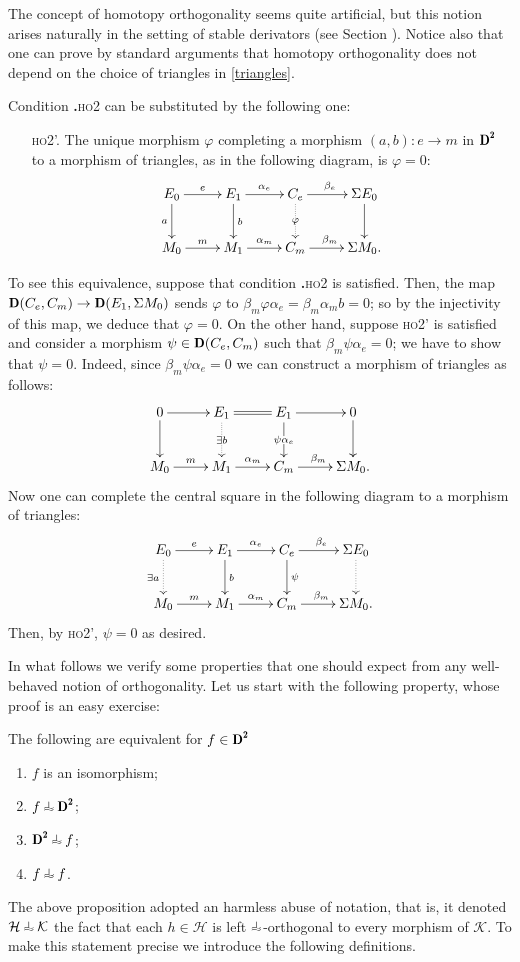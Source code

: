 The concept of homotopy orthogonality seems quite artificial, but this notion arises naturally in the setting of stable derivators (see Section ). Notice also that one can prove by standard arguments that homotopy orthogonality does not depend on the choice of triangles in \eqref{triangles}.
\begin{remark}
Condition \textbf{.}\textsc{ho2} can be substituted by the following one:
\begin{enumerate}%
\item[\textsc{ho}2'.] The unique morphism $\varphi$ completing a morphism $(a,b)\colon e\to m$ in $\cD^\due$ to a morphism of triangles, as in the following diagram, is $\varphi=0$:
$$\xymatrix{
E_0\ar[r]^{e}\ar[d]_a&E_1\ar[r]^{\alpha_e}\ar[d]^b&C_e\ar[r]^{\beta_e}\ar@{.>}[d]|\varphi&\Sigma E_0\ar[d]\\
M_0\ar[r]^m&M_1\ar[r]^{\alpha_m}&C_m\ar[r]^{\beta_m}&\Sigma M_0.
}$$ 
\end{enumerate}
To see this equivalence, suppose that condition \textbf{.}\textsc{ho2} is satisfied. Then, the map $\cD(C_e,C_m)\to \cD(E_1,\Sigma M_0)$ sends $\varphi$ to $\beta_m\varphi\alpha_e=\beta_m\alpha_m b=0$; so by the injectivity of this map, we deduce that $\varphi=0$. On the other hand, suppose \textsc{ho}2' is satisfied and consider a morphism $\psi\in \cD(C_e,C_m)$ such that $\beta_m\psi\alpha_e=0$; we have to show that $\psi=0$. Indeed, since $\beta_m\psi\alpha_e=0$ we can construct a morphism of triangles as follows:
$$\xymatrix{
0\ar[r]\ar[d]&E_1\ar@{=}[r]\ar@{.>}[d]|{\exists b}&E_1\ar[r]^{}\ar[d]|{\psi\alpha_e}&0\ar[d]\\
M_0\ar[r]^m&M_1\ar[r]^{\alpha_m}&C_m\ar[r]^{\beta_m}&\Sigma M_0.
}$$ 
Now one can complete the central square in the following diagram to a morphism of triangles:
$$\xymatrix{
E_0\ar[r]^{e}\ar@{.>}[d]_{\exists a}&E_1\ar[r]^{\alpha_e}\ar[d]^b&C_e\ar[r]^{\beta_e}\ar[d]^\psi&\Sigma E_0\ar@{.>}[d]\\
M_0\ar[r]^m&M_1\ar[r]^{\alpha_m}&C_m\ar[r]^{\beta_m}&\Sigma M_0.
}$$ 
Then, by \textsc{ho}2', $\psi=0$ as desired.
\end{remark}
In what follows we verify some properties that one should expect from any well-behaved notion of orthogonality. 
Let us start with the following property, whose proof is an easy exercise:
\begin{lemma}\label{is_an_iso_if_horth_to_all}
The following are equivalent for $f\in\cD^\due$
\begin{enumerate}[label=(\roman*)]
	\item $f$ is an isomorphism;
	\item $f\horth \cD^\due$;
	\item $\cD^\due\horth f$;
	\item $f\horth f$.
\end{enumerate}
\end{lemma}
The above proposition adopted an harmless abuse of notation, that is, it denoted $\mathcal{H}\horth \mathcal{K}$ the fact that each $h\in\mathcal{H}$ is left $\horth$-orthogonal to every morphism of $\mathcal{K}$. To make this statement precise we introduce the following definitions.

